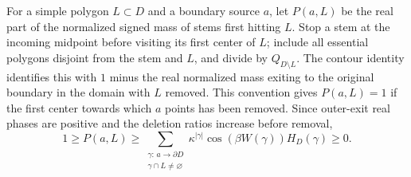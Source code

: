 For a simple polygon $L\subset D$ and a boundary source $a$, let $P(a,L)$ be the real part of the normalized signed mass of stems first hitting $L$. Stop a stem at the incoming midpoint before visiting its first center of $L$; include all essential polygons disjoint from the stem and $L$, and divide by $Q_{D\setminus L}$. The contour identity identifies this with $1$ minus the real normalized mass exiting to the original boundary in the domain with $L$ removed. This convention gives $P(a,L)=1$ if the first center towards which $a$ points has been removed. Since outer-exit real phases are positive and the deletion ratios increase before removal,
\begin{equation}\label{eq:first-hit-comparison}
 1\ge P(a,L)\ge
 \sum_{\substack{\gamma:\,a\to\partial D\\\gamma\cap L\ne\varnothing}}
 \kappa^{|\gamma|}\cos(\beta W(\gamma))H_D(\gamma)\ge0.
\end{equation}

